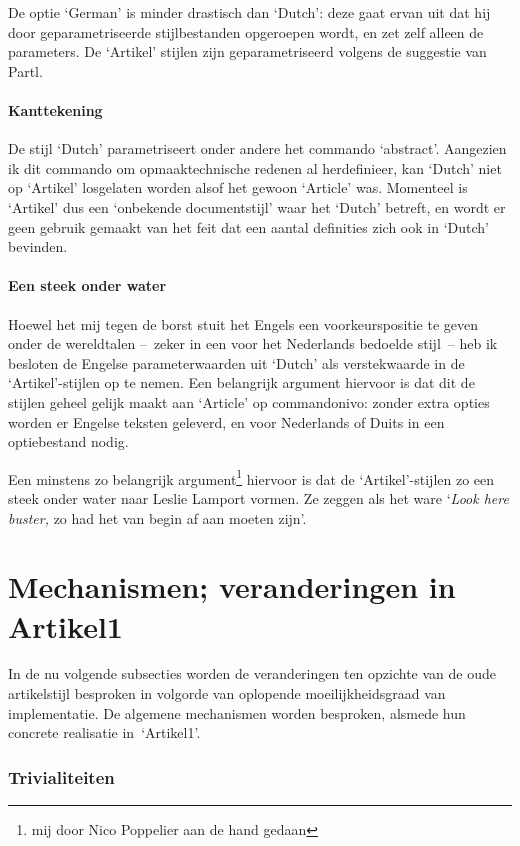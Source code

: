 \documentclass[a4paper]{artikel1} %
\begin{document}
De optie `German' is minder drastisch dan `Dutch': deze gaat ervan uit
dat hij door geparametriseerde stijlbestanden opgeroepen wordt, en zet
zelf alleen de parameters.  De `Artikel' stijlen zijn geparametriseerd
volgens de suggestie van Partl.
 
\subsection{Kanttekening}De stijl `Dutch' parametriseert
onder andere het commando `abstract'. Aangezien ik dit commando om
opmaaktechnische redenen al herdefinieer, kan `Dutch' niet op
`Artikel' losgelaten worden alsof het gewoon `Article' was. Momenteel
is `Artikel' dus een `onbekende documentstijl' waar het `Dutch'
betreft, en wordt er geen gebruik gemaakt van het feit dat een aantal
definities zich ook in `Dutch' bevinden.
 
\subsection{Een steek onder water}
Hoewel het mij tegen de borst stuit het Engels een voorkeurspositie te
geven onder de wereldtalen --~zeker in een voor het Nederlands
bedoelde stijl~-- heb ik besloten de Engelse parameterwaarden uit
`Dutch' als verstekwaarde in de `Artikel'-stijlen op te nemen. Een
belangrijk argument hiervoor is dat dit de stijlen geheel gelijk maakt
aan `Article' op commando\-nivo: zonder extra opties worden er Engelse
teksten geleverd, en voor Nederlands of Duits in een optiebestand
nodig.
 
Een minstens zo belangrijk argument\footnote{mij door Nico Poppelier
  aan de hand gedaan} hiervoor is dat de `Artikel'-stijlen zo een
steek onder water naar Leslie Lamport vormen. Ze zeggen als het ware
`\emph{Look here buster,} zo had het van begin af aan moeten zijn'.
 
\part{Mechanismen; veranderingen in Artikel1}
 
In de nu volgende subsecties worden de veranderingen ten opzichte van
de oude artikelstijl besproken in volgorde van oplopende
moeilijkheidsgraad van implementatie. De algemene mechanismen worden
besproken, alsmede hun concrete realisatie in~`Artikel1'.
 
\section{Trivialiteiten}
 
\end{document}
